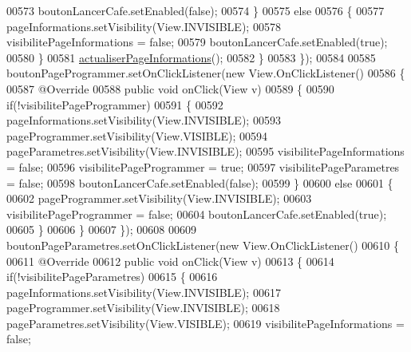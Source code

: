\begin{DoxyCode}
00573                     boutonLancerCafe.setEnabled(\textcolor{keyword}{false});
00574                 \}
00575                 \textcolor{keywordflow}{else}
00576                 \{
00577                     pageInformations.setVisibility(View.INVISIBLE);
00578                     visibilitePageInformations = \textcolor{keyword}{false};
00579                     boutonLancerCafe.setEnabled(\textcolor{keyword}{true});
00580                 \}
00581                 \hyperlink{classcom_1_1example_1_1ekawa_1_1_ihm_a2422719a8e893b23e95f80b5899adb76}{actualiserPageInformations}();
00582             \}
00583         \});
00584 
00585         boutonPageProgrammer.setOnClickListener(\textcolor{keyword}{new} View.OnClickListener()
00586         \{
00587             @Override
00588             \textcolor{keyword}{public} \textcolor{keywordtype}{void} onClick(View v)
00589             \{
00590                 \textcolor{keywordflow}{if}(!visibilitePageProgrammer)
00591                 \{
00592                     pageInformations.setVisibility(View.INVISIBLE);
00593                     pageProgrammer.setVisibility(View.VISIBLE);
00594                     pageParametres.setVisibility(View.INVISIBLE);
00595                     visibilitePageInformations = \textcolor{keyword}{false};
00596                     visibilitePageProgrammer = \textcolor{keyword}{true};
00597                     visibilitePageParametres = \textcolor{keyword}{false};
00598                     boutonLancerCafe.setEnabled(\textcolor{keyword}{false});
00599                 \}
00600                 \textcolor{keywordflow}{else}
00601                 \{
00602                     pageProgrammer.setVisibility(View.INVISIBLE);
00603                     visibilitePageProgrammer = \textcolor{keyword}{false};
00604                     boutonLancerCafe.setEnabled(\textcolor{keyword}{true});
00605                 \}
00606             \}
00607         \});
00608 
00609         boutonPageParametres.setOnClickListener(\textcolor{keyword}{new} View.OnClickListener()
00610         \{
00611             @Override
00612             \textcolor{keyword}{public} \textcolor{keywordtype}{void} onClick(View v)
00613             \{
00614                 \textcolor{keywordflow}{if}(!visibilitePageParametres)
00615                 \{
00616                     pageInformations.setVisibility(View.INVISIBLE);
00617                     pageProgrammer.setVisibility(View.INVISIBLE);
00618                     pageParametres.setVisibility(View.VISIBLE);
00619                     visibilitePageInformations = \textcolor{keyword}{false};

\end{DoxyCode}
